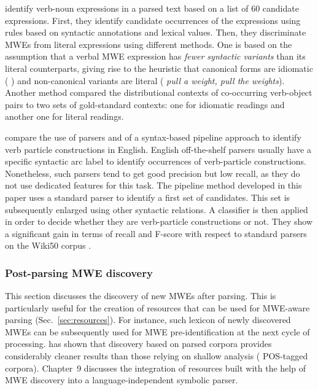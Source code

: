 \documentclass[output=paper]{LSP/langsci}
\begin{document}
\citet{fazly-cook-stevenson:2009:cl} identify verb-noun expressions in a parsed text based on a list of 60 candidate expressions. First, they identify candidate occurrences of the expressions using rules based on syntactic annotations and lexical values. Then, they discriminate  MWEs from literal expressions using different methods. One is based on the assumption that a verbal MWE expression has \emph{fewer syntactic variants} than its literal counterparts, giving rise to the heuristic that canonical forms are idiomatic (\eg{} ) and non-canonical variants are literal (\eg{} \textit{pull a weight, pull the weights}). Another method
compared the distributional contexts of co-occurring verb-object pairs to two sets of gold-standard contexts: one for idiomatic readings and another one for literal readings. 

\citet{nagyt-vincze:2014:mwe} compare the use of parsers and of a syntax-based pipeline approach to identify verb particle constructions in English. English off-the-shelf parsers usually have a specific syntactic arc label to identify occurrences of verb-particle constructions. Nonetheless, such parsers tend to get good precision but low recall, as they do not use dedicated features for this task. The pipeline method developed in this paper  uses a standard parser to identify a first set of candidates. This set is subsequently enlarged using other syntactic relations. A classifier is then applied in order to decide whether they are verb-particle constructions or not. They show a significant gain in terms of recall and F-score with respect to standard parsers on the Wiki50 corpus \citep{vincze11}.

\subsubsection{Post-parsing MWE discovery}
\label{ssec:discopost}


{This section discusses the discovery of new MWEs after parsing. This is particularly useful for the creation of resources that can be used for MWE-aware parsing (Sec.~\ref{sec:resources}). 
For instance, such lexicon of newly discovered MWEs can be subsequently used for MWE pre-identification at the next cycle of processing.
\citet{seretan11} has shown that discovery based on parsed corpora provides considerably cleaner {results than those relying on shallow analysis (\eg{} POS-tagged corpora)}. Chapter~9 discusses the integration of resources built with the help of MWE discovery into a language-independent symbolic parser.}
\end{document}
